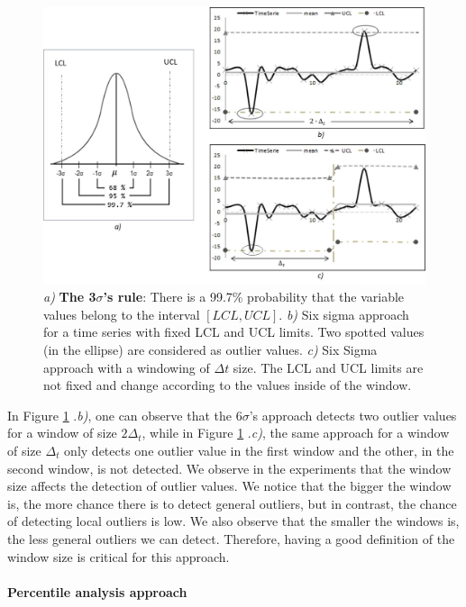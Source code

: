 \begin{figure}[h!]
  \vspace{0.5em} %
  \includegraphics[scale=0.5]{Figures/Six_sigma_example.jpg}
  \caption{\textit{a)} \textbf{The 3$\sigma$'s rule}: There is a 99.7\% probability that the variable values belong to the interval $[LCL,UCL]$. \textit{b)} Six sigma approach for a time series with fixed LCL and UCL limits. Two spotted values (in the ellipse) are considered as outlier values. \textit{c)} Six Sigma approach with a windowing of $\Delta t$ size. The LCL and UCL limits are not fixed and change according to the values inside of the window.  }
  \label{fig:six_sigma}
\end{figure}

In Figure \ref{fig:six_sigma}{\color{red} .\textit{b)}}, one can observe that the $6\sigma$'s approach detects two outlier values for a window of size $2\Delta_t$, while in Figure \ref{fig:six_sigma}{\color{red} .\textit{c)}}, the same approach for a window of size $\Delta_t$ only detects one outlier value in the first window and the other, in the second window, is not detected. We observe in the experiments that the window size affects the detection of outlier values. We notice that the bigger the window is, the more chance there is to detect general outliers, but in contrast, the chance of detecting local outliers is low. We also observe that the smaller the windows is, the less general outliers we can detect. Therefore, having a good definition of the window size is critical for this approach.


\paragraph{Percentile analysis approach}

